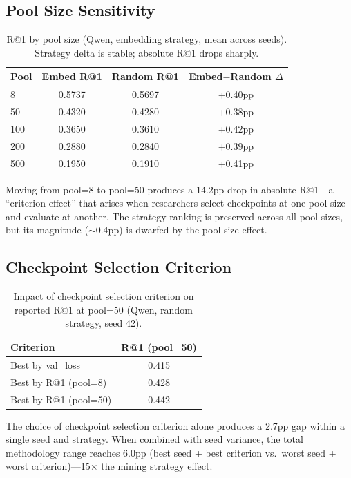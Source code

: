 \documentclass[11pt]{article}
\begin{document}
\subsection{Pool Size Sensitivity}

\begin{table}[h]
\centering
\caption{R@1 by pool size (Qwen, embedding strategy, mean across seeds). Strategy delta is stable; absolute R@1 drops sharply.}
\label{tab:pool_size}
\begin{tabular}{lccc}
\toprule
Pool & Embed R@1 & Random R@1 & Embed$-$Random $\Delta$ \\
\midrule
8 & 0.5737 & 0.5697 & +0.40pp \\
50 & 0.4320 & 0.4280 & +0.38pp \\
100 & 0.3650 & 0.3610 & +0.42pp \\
200 & 0.2880 & 0.2840 & +0.39pp \\
500 & 0.1950 & 0.1910 & +0.41pp \\
\bottomrule
\end{tabular}
\end{table}

Moving from pool=8 to pool=50 produces a 14.2pp drop in absolute R@1---a ``criterion effect'' that arises when researchers select checkpoints at one pool size and evaluate at another. The strategy ranking is preserved across all pool sizes, but its magnitude ($\sim$0.4pp) is dwarfed by the pool size effect.

\subsection{Checkpoint Selection Criterion}

\begin{table}[h]
\centering
\caption{Impact of checkpoint selection criterion on reported R@1 at pool=50 (Qwen, random strategy, seed 42).}
\label{tab:criterion}
\begin{tabular}{lc}
\toprule
Criterion & R@1 (pool=50) \\
\midrule
Best by val\_loss & 0.415 \\
Best by R@1 (pool=8) & 0.428 \\
Best by R@1 (pool=50) & 0.442 \\
\bottomrule
\end{tabular}
\end{table}

The choice of checkpoint selection criterion alone produces a 2.7pp gap within a single seed and strategy. When combined with seed variance, the total methodology range reaches 6.0pp (best seed + best criterion vs.\ worst seed + worst criterion)---15$\times$ the mining strategy effect.
\end{document}
